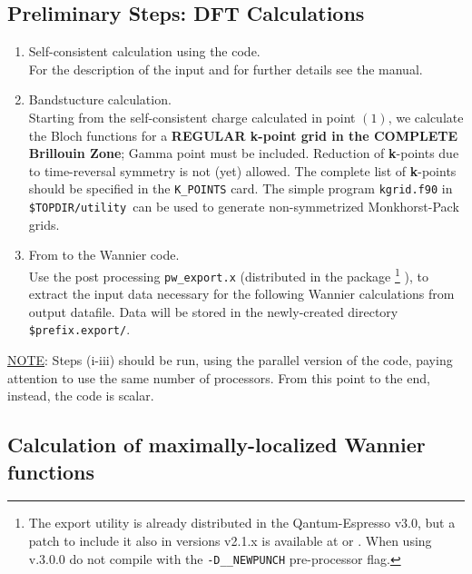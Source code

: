\subsection{Preliminary Steps: DFT
Calculations}\label{subsection:run_dft}
\renewcommand{\theenumi}{\roman{enumi}}
\renewcommand{\labelenumi}{\theenumi)}
\begin{enumerate}
%
\item Self-consistent calculation using the \PWSCF code.\\
      \noindent For the description of the input and for further details see the \PWSCF
      manual.
\item Bandstucture calculation.\\
      \noindent  Starting from the self-consistent charge
      calculated in point $(1)$, we calculate the Bloch functions for a
      {\bf REGULAR {\bf k}-point grid in the COMPLETE Brillouin Zone}; Gamma point
      must be included. Reduction of \textbf{k}-points due to time-reversal
      symmetry is not (yet) allowed. The complete list of
      \textbf{k}-points should be specified in the {\tt K\_POINTS} card.
      The simple program
      {\tt kgrid.f90} in {\tt \$TOPDIR/utility }can be used to generate non-symmetrized
      Monkhorst-Pack grids.
\item From \PWSCF to the Wannier code.\\
      \noindent Use the post processing
      {\tt pw\_export.x} (distributed in the \PWSCF package
      \footnote{The export utility is already distributed in the
      Qantum-Espresso v3.0, but a patch to include it also in versions v2.1.x is
      available at \WANTURL{} or \PWSCFURL{}. When using v.3.0.0 do not compile with
      the {\tt -D\_\_NEWPUNCH} pre-processor flag.}
      ),
      to extract the input data necessary for the following Wannier
      calculations
      from \PWSCF output datafile. Data will be stored in the
      newly-created directory {\tt \$prefix.export/}.
\end{enumerate}

\noindent \underline{NOTE}: Steps (i-iii) should be run, using the
parallel version of the code, paying attention to use the same
number of processors. From this point to the end, instead, the
code is scalar.

\subsection {Calculation of maximally-localized Wannier
functions}\label{subsection:run_wannier}

